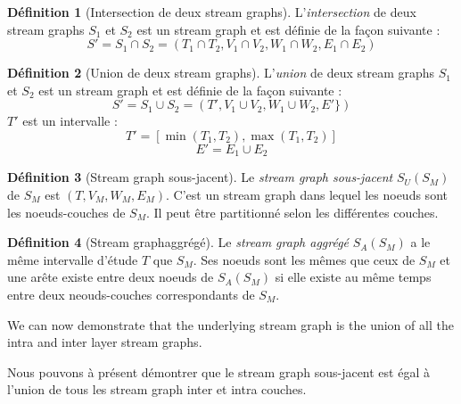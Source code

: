 \documentclass[11pt,a4paper]{article}
\theoremstyle{definition}
\newtheorem{defn}{Définition}
\theoremstyle{remark}
\theoremstyle{remark}
\def \stg {stream graph}
\def \Stg {Stream graph}
\begin{document}
	\begin{defn}[Intersection de deux stream graphs]
	L'{\em intersection} de deux stream graphs $S_1$ et $S_2$ est un stream graph et est définie de la façon suivante :
	\[
		S' = S_1 \cap S_2 = (T_1\cap T_2, V_1 \cap V_2, W_1 \cap W_2, E_1\cap E_2)
	\]
	\end{defn}
	

	\begin{defn}[Union de deux stream graphs]
	L'{\em union} de deux stream graphs $S_1$ et $S_2$ est un stream graph et est définie de la façon suivante :
	\[
		S' = S_1 \cup S_2 = (T', V_1 \cup V_2, W_1 \cup W_2, E' \})
	\]
	$T'$ est un intervalle :
	\[
		T' = [\min(T_1,T_2),\max(T_1,T_2)]
	\]
	\[
		E' = E_1 \cup E_2 
	\]
	
	\end{defn}
	
	

	
	\begin{defn}[\Stg{} sous-jacent]
	Le {\em \stg{} sous-jacent} $S_U(S_M)$ de $S_M$ est $(T,V_M,W_M,E_M)$. C'est un \stg{} dans lequel les noeuds sont les noeuds-couches de $S_M$. Il peut être partitionné selon les différentes couches.
	\end{defn}
	
	\begin{defn}[\Stg aggrégé]
		Le {\em \stg{} aggrégé} $S_A(S_M)$ a le même intervalle d'étude $T$ que $S_M$. Ses noeuds sont les mêmes que ceux de $S_M$ et une arête existe entre deux noeuds de $S_A(S_M)$ si elle existe au même temps entre deux neouds-couches correspondants de $S_M$. 
	\end{defn}
	
	We can now demonstrate that the underlying stream graph is the union of all the intra and inter layer stream graphs.
	
	Nous pouvons à présent démontrer que le \stg{} sous-jacent est égal à l'union de tous les \stg{} inter et intra couches.
	
\end{document}
